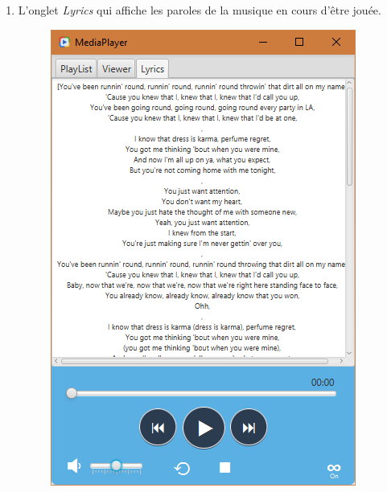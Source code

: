 \documentclass[a4paper,12pt]{report} %
\begin{document}
\begin{enumerate}
   		\item L'onglet \textit{Lyrics} qui affiche les paroles de la musique en cours d'être jouée.
   			\begin{figure}[ht] 		
				\centering
  				\includegraphics[scale=0.62]{lyrics}
			\end{figure} 
		

\end{enumerate}
\end{document}
